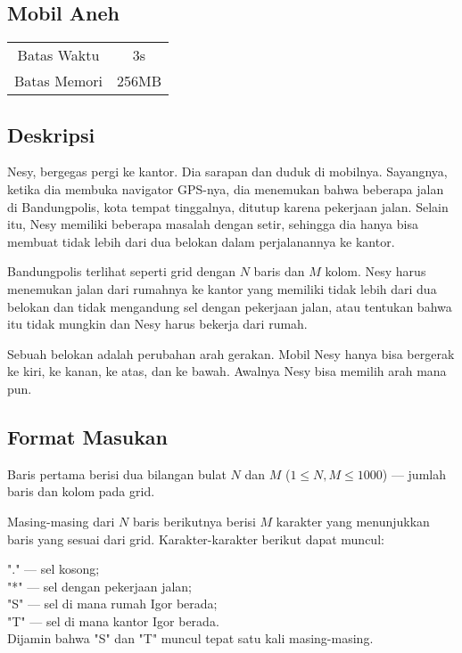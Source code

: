 \documentclass{article}
\begin{document}
\begin{center}

    
    \section*{Mobil Aneh} %

    \begin{tabular}{ | c c | }
        \hline
        Batas Waktu  & 3s \\    %
        Batas Memori & 256MB \\  %
        \hline
    \end{tabular}
\end{center}

\subsection*{Deskripsi}

Nesy, bergegas pergi ke kantor. Dia sarapan dan duduk di mobilnya. Sayangnya, ketika dia membuka navigator GPS-nya, dia menemukan bahwa beberapa jalan di Bandungpolis, kota tempat tinggalnya, ditutup karena pekerjaan jalan. Selain itu, Nesy memiliki beberapa masalah dengan setir, sehingga dia hanya bisa membuat tidak lebih dari dua belokan dalam perjalanannya ke kantor.

Bandungpolis terlihat seperti grid dengan $N$ baris dan $M$ kolom. Nesy harus menemukan jalan dari rumahnya ke kantor yang memiliki tidak lebih dari dua belokan dan tidak mengandung sel dengan pekerjaan jalan, atau tentukan bahwa itu tidak mungkin dan Nesy harus bekerja dari rumah.

Sebuah belokan adalah perubahan arah gerakan. Mobil Nesy hanya bisa bergerak ke kiri, ke kanan, ke atas, dan ke bawah. Awalnya Nesy bisa memilih arah mana pun.

\subsection*{Format Masukan}

Baris pertama berisi dua bilangan bulat $N$ dan $M$ ($1 \leq N, M \leq 1000$) — jumlah baris dan kolom pada grid.

Masing-masing dari $N$ baris berikutnya berisi $M$ karakter yang menunjukkan baris yang sesuai dari grid. Karakter-karakter berikut dapat muncul:

"." — sel kosong; \\
"*" — sel dengan pekerjaan jalan; \\
"S" — sel di mana rumah Igor berada; \\
"T" — sel di mana kantor Igor berada. \\
Dijamin bahwa "S" dan "T" muncul tepat satu kali masing-masing.
\end{document}
